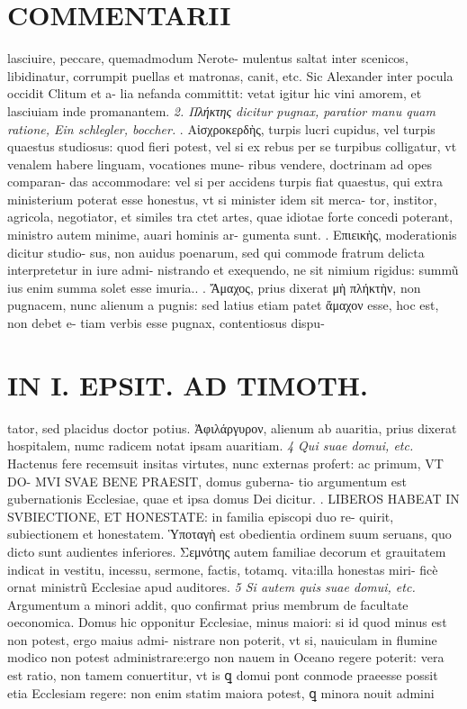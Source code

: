 \documentclass{article}
\begin{document}
\begin{pages}
\section*{COMMENTARII }\pstart lasciuire, peccare, quemadmodum Nerote- mulentus saltat inter scenicos, libidinatur, corrumpit puellas et matronas, canit, etc. Sic Alexander inter pocula occidit Clitum et a- lia nefanda committit: vetat igitur hic vini amorem, et lasciuiam inde promanantem.  \pend
\textit{2. Πλήκτης dicitur pugnax, paratior manu quam ratione, Ein schlegler, boccher. }. Αἰσχροκερδὴς, turpis lucri cupidus, vel turpis quaestus studiosus: quod fieri potest, vel si ex rebus per se turpibus colligatur, vt venalem habere linguam, vocationes mune- ribus vendere, doctrinam ad opes comparan- das accommodare: vel si per accidens turpis fiat quaestus, qui extra ministerium poterat esse honestus, vt si minister idem sit merca- tor, institor, agricola, negotiator, et similes tra ctet artes, quae idiotae forte concedi poterant, ministro autem minime, auari hominis ar- gumenta sunt.  \pend{}. Επιεικὴς, moderationis dicitur studio- sus, non auidus poenarum, sed qui commode fratrum delicta interpretetur in iure admi- nistrando et exequendo, ne sit nimium rigidus: summũ ius enim summa solet esse imuria..  \pend{}. Ἄμαχος, prius dixerat μὴ πλήκτὴν, non pugnacem, nunc alienum a pugnis: sed latius etiam patet ἄμαχον esse, hoc est, non debet e- tiam verbis esse pugnax, contentiosus dispu-  \pend
\section*{IN I. EPSIT. AD TIMOTH. }
\marginpar{[ p.67 ]}\pstart tator, sed placidus doctor potius.  \pend{} Ἀφιλάργυρον, alienum ab auaritia, prius dixerat hospitalem, numc radicem notat ipsam auaritiam.  \pend
\textit{4 Qui suae domui, etc. }\pstart Hactenus fere recemsuit insitas virtutes, nunc externas profert: ac primum, VT DO- MVI SVAE BENE PRAESIT, domus guberna- tio argumentum est gubernationis Ecclesiae, quae et ipsa domus Dei dicitur.  \pend{}. LIBEROS HABEAT IN SVBIECTIONE, ET HONESTATE: in familia episcopi duo re- quirit, subiectionem et honestatem. Ὑποταγὴ est obedientia ordinem suum seruans, quo dicto sunt audientes inferiores. Σεμνότης autem familiae decorum et grauitatem indicat in vestitu, incessu, sermone, factis, totamq. vita:illa honestas miri- ficè ornat ministrũ Ecclesiae apud auditores.  \pend
\textit{5 Si autem quis suae domui, etc. }\pstart Argumentum a minori addit, quo confirmat prius membrum de facultate oeconomica. Domus hic opponitur Ecclesiae, minus maiori: si id quod minus est non potest, ergo maius admi- nistrare non poterit, vt si, nauiculam in flumine modico non potest administrare:ergo non nauem in Oceano regere poterit: vera est ratio, non tamem conuertitur, vt is ꝗ domui pont conmode praeesse possit etia Ecclesiam regere: non enim statim maiora potest, ꝗ minora nouit admini  \pend
\marginpar{[ p.68 ]}

\end{pages}
\end{document}
